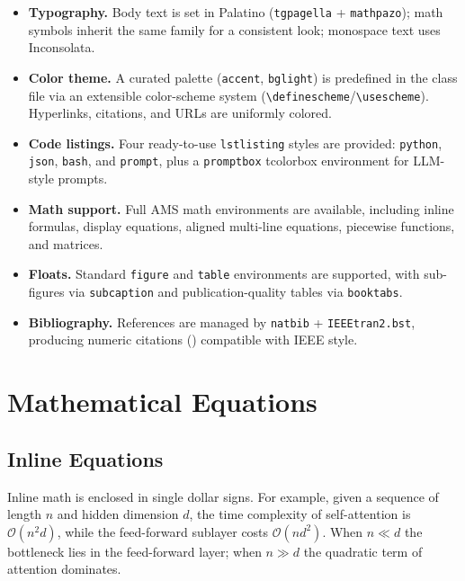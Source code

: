 \documentclass[opendfm]{xlance/xlance}
\begin{document}
\begin{itemize}
    \item \textbf{Typography.} Body text is set in Palatino (\texttt{tgpagella} + \texttt{mathpazo}); math symbols inherit the same family for a consistent look; monospace text uses Inconsolata.
    \item \textbf{Color theme.} A curated palette (\texttt{accent}, \texttt{bglight}) is predefined in the class file via an extensible color-scheme system (\verb|\definescheme|/\verb|\usescheme|). Hyperlinks, citations, and URLs are uniformly colored.
    \item \textbf{Code listings.} Four ready-to-use \texttt{lstlisting} styles are provided: \texttt{python}, \texttt{json}, \texttt{bash}, and \texttt{prompt}, plus a \texttt{promptbox} tcolorbox environment for LLM-style prompts.
    \item \textbf{Math support.} Full AMS math environments are available, including inline formulas, display equations, aligned multi-line equations, piecewise functions, and matrices.
    \item \textbf{Floats.} Standard \texttt{figure} and \texttt{table} environments are supported, with sub-figures via \texttt{subcaption} and publication-quality tables via \texttt{booktabs}.
    \item \textbf{Bibliography.} References are managed by \texttt{natbib} + \texttt{IEEEtran2.bst}, producing numeric citations (\eg \cite{vaswani2017attention}) compatible with IEEE style.
\end{itemize}


\section{Mathematical Equations}
\label{section:math}

\subsection{Inline Equations}

Inline math is enclosed in single dollar signs. For example, given a sequence of length $n$ and hidden dimension $d$, the time complexity of self-attention is $\mathcal{O}(n^2 d)$, while the feed-forward sublayer costs $\mathcal{O}(n d^2)$. When $n \ll d$ the bottleneck lies in the feed-forward layer; when $n \gg d$ the quadratic term of attention dominates.
\end{document}
